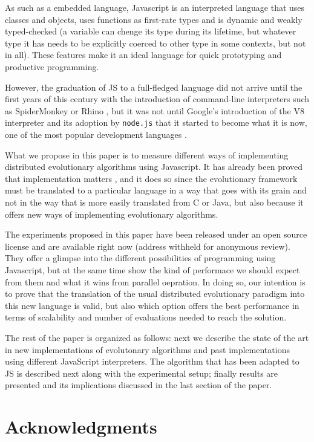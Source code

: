 \documentclass{sig-alternate}
\begin{document}
As such as a embedded language, Javascript is an interpreted language
that uses classes and objects, uses functions as first-rate types and
is dynamic and weakly typed-checked (a variable can chenge its type during
its lifetime, but whatever type it has needs to be explicitly coerced
to other type in some contexts, but not in all). These features make
it an ideal language for quick prototyping and productive
programming. 

However, the graduation of JS to a full-fledged language did not arrive until the first years of
this century with the introduction of command-line interpreters such
as SpiderMonkey or Rhino \cite{mikkonen2007using}, but it was not
until Google's introduction of the V8 \cite{richards2010analysis}
interpreter and its adoption by  {\tt node.js} that it started to
become what it is now, one of the most popular development languages
\cite{ogrady14:ranking}.

What we propose in this paper is to measure different ways of
implementing distributed evolutionary algorithms using Javascript. It
has already been proved that implementation matters
\cite{DBLP:conf/iwann/MereloRACML11}, and it does so since the
evolutionary framework must be translated to a particular language in
a way that goes with its grain and not in the way that is more easily
translated from C or Java, but also because it offers new ways of
implementing evolutionary algorithms.

The experiments proposed in this paper have been released under an
open source license and are available right now (address withheld for
anonymous review). They offer a glimpse into the different
possibilities of programming using Javascript, but at the same time
show the kind of performace we should expect from them and what it
wins from parallel oepration. In doing so, our intention is to prove
that the translation of the usual distributed evolutionary paradigm
into this new language is valid, but also which option offers the best
performance in terms of scalability and number of evaluations needed
to reach the solution.

The rest of the paper is organized as follows: next we describe the
state of the art in new implementations of evolutonary algorithms and
past implementations using different JavaScript interpreters. The
algorithm that has been adapted to JS is described next along with the
experimental setup; finally results are presented and its implications
discussed in the last section of the paper. 

 


\section{Acknowledgments}


%

\end{document}
